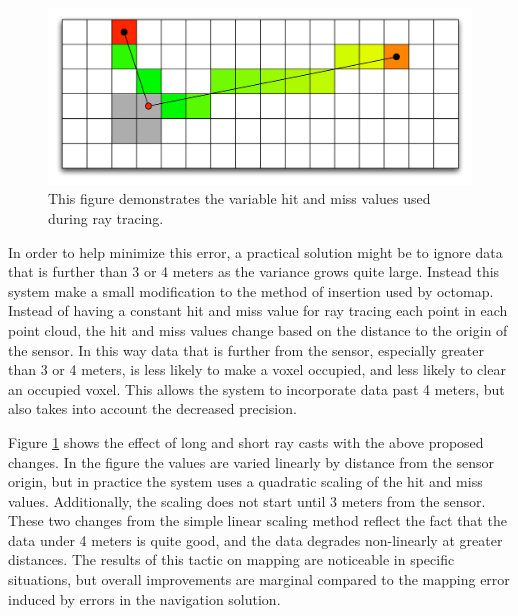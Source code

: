 \documentclass[12pt]{report}
\begin{document}
\begin{figure}[ht]
  \centering
  \includegraphics[width=6in,keepaspectratio]{variable_hit_miss.pdf}
  \caption{This figure demonstrates the variable hit and miss values used during ray tracing.}
  \label{fig:variable_hit_miss}
\end{figure}

In order to help minimize this error, a practical solution might be to ignore data that is further than 3 or 4 meters as the variance grows quite large.  Instead this system make a small modification to the method of insertion used by octomap.  Instead of having a constant hit and miss value for ray tracing each point in each point cloud, the hit and miss values change based on the distance to the origin of the sensor.  In this way data that is further from the sensor, especially greater than 3 or 4 meters, is less likely to make a voxel occupied, and less likely to clear an occupied voxel.  This allows the system to incorporate data past 4 meters, but also takes into account the decreased precision.

Figure \ref{fig:variable_hit_miss} shows the effect of long and short ray casts with the above proposed changes.  In the figure the values are varied linearly by distance from the sensor origin, but in practice the system uses a quadratic scaling of the hit and miss values.  Additionally, the scaling does not start until 3 meters from the sensor.  These two changes from the simple linear scaling method reflect the fact that the data under 4 meters is quite good, and the data degrades non-linearly at greater distances.  The results of this tactic on mapping are noticeable in specific situations, but overall improvements are marginal compared to the mapping error induced by errors in the navigation solution.

\end{document}
